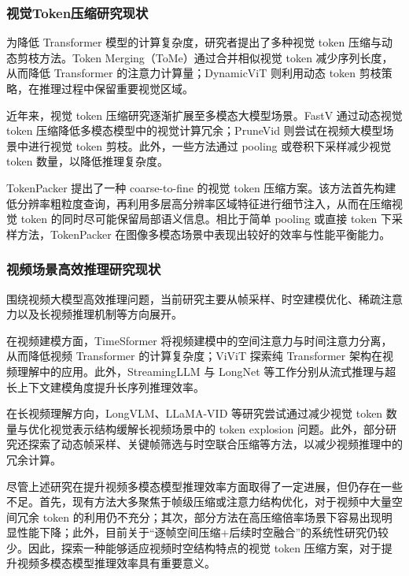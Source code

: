 \subsubsection{视觉Token压缩研究现状}

为降低 Transformer 模型的计算复杂度，研究者提出了多种视觉 token 压缩与动态剪枝方法。Token Merging（ToMe）通过合并相似视觉 token 减少序列长度，从而降低 Transformer 的注意力计算量\cite{tome2023}；DynamicViT 则利用动态 token 剪枝策略，在推理过程中保留重要视觉区域\cite{dynamicvit2021}。

近年来，视觉 token 压缩研究逐渐扩展至多模态大模型场景。FastV 通过动态视觉 token 压缩降低多模态模型中的视觉计算冗余；PruneVid 则尝试在视频大模型场景中进行视觉 token 剪枝\cite{prunevid2024}。此外，一些方法通过 pooling 或卷积下采样减少视觉 token 数量，以降低推理复杂度。

TokenPacker 提出了一种 coarse-to-fine 的视觉 token 压缩方案\cite{tokenpacker2024}。该方法首先构建低分辨率粗粒度查询，再利用多层高分辨率区域特征进行细节注入，从而在压缩视觉 token 的同时尽可能保留局部语义信息。相比于简单 pooling 或直接 token 下采样方法，TokenPacker 在图像多模态场景中表现出较好的效率与性能平衡能力。

\subsubsection{视频场景高效推理研究现状}

围绕视频大模型高效推理问题，当前研究主要从帧采样、时空建模优化、稀疏注意力以及长视频推理机制等方向展开。

在视频建模方面，TimeSformer 将视频建模中的空间注意力与时间注意力分离，从而降低视频 Transformer 的计算复杂度\cite{timesformer2021}；ViViT 探索纯 Transformer 架构在视频理解中的应用\cite{vivit2021}。此外，StreamingLLM 与 LongNet 等工作分别从流式推理与超长上下文建模角度提升长序列推理效率\cite{streamingllm2023,longnet2023}。

在长视频理解方向，LongVLM、LLaMA-VID 等研究尝试通过减少视觉 token 数量与优化视觉表示结构缓解长视频场景中的 token explosion 问题\cite{longvlm2024,llamavid2024}。此外，部分研究还探索了动态帧采样、关键帧筛选与时空联合压缩等方法，以减少视频推理中的冗余计算。

尽管上述研究在提升视频多模态模型推理效率方面取得了一定进展，但仍存在一些不足。首先，现有方法大多聚焦于帧级压缩或注意力结构优化，对于视频中大量空间冗余 token 的利用仍不充分；其次，部分方法在高压缩倍率场景下容易出现明显性能下降；此外，目前关于“逐帧空间压缩+后续时空融合”的系统性研究仍较少。因此，探索一种能够适应视频时空结构特点的视觉 token 压缩方案，对于提升视频多模态模型推理效率具有重要意义。


